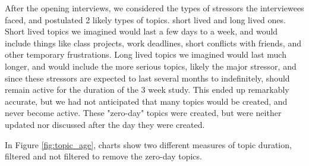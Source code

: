    After the opening interviews, we considered the types of stressors the
    interviewees faced, and postulated 2 likely types of topics.
    short lived and long lived ones.
    Short lived topics we imagined would last a few days to a week,
    and would include things like class projects,
    work deadlines, short conflicts with friends, and other temporary frustrations.
    Long lived topics we imagined would last much longer,
    and would include the more serious topics, likely the major stressor,
    and since these stressors are expected to last several months to indefinitely,
    should remain active for the duration of the 3 week study.
    This ended up remarkably accurate,
    but we had not anticipated that many topics would be created,
    and never become active.
    These "zero-day" topics were created,
    but were neither updated nor discussed after the day they were created.

    In Figure \ref{fig:topic_age}, charts show two different measures of 
    topic duration, filtered and not filtered to remove the zero-day topics.

